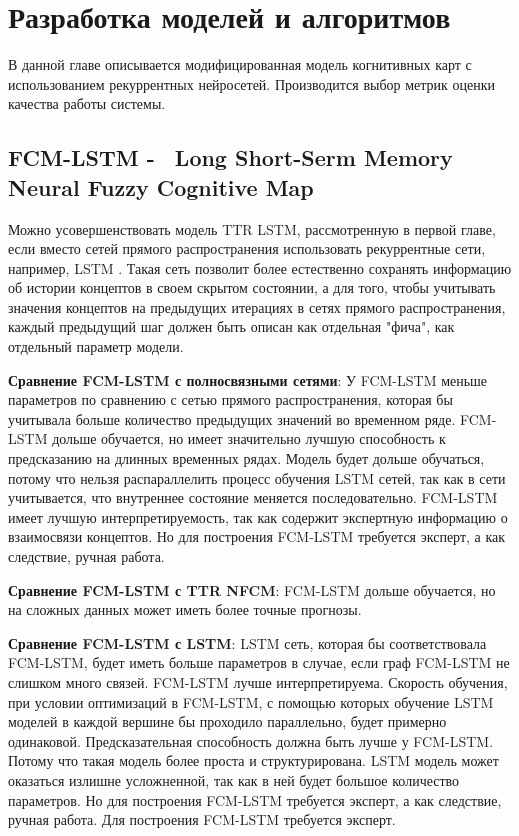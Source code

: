 \chapter{Разработка моделей и алгоритмов}

\begin{annotation}
	В данной главе описывается модифицированная модель
	когнитивных карт с использованием рекуррентных нейросетей.
	Производится выбор метрик оценки качества работы системы.
\end{annotation}

\section{FCM-LSTM -~ Long Short-Serm Memory Neural Fuzzy Cognitive Map}

Можно усовершенствовать модель TTR LSTM, рассмотренную в первой главе,
если вместо сетей прямого распространения использовать рекуррентные сети,
например, LSTM \cite{LSTM_paper}. Такая сеть позволит более естественно
сохранять информацию об истории концептов в своем скрытом состоянии,
а для того, чтобы учитывать значения концептов на предыдущих итерациях
в сетях прямого распространения, каждый предыдущий шаг должен быть
описан как отдельная "фича", как отдельный параметр модели.

\textbf{Сравнение FCM-LSTM с полносвязными сетями}:
У FCM-LSTM меньше параметров по сравнению с сетью прямого распространения,
которая бы учитывала больше количество предыдущих значений во временном ряде.
FCM-LSTM дольше обучается, но имеет значительно лучшую способность к предсказанию
на длинных временных рядах.
Модель будет дольше обучаться, потому что нельзя распараллелить
процесс обучения LSTM сетей, так как в сети учитывается, что внутреннее состояние меняется последовательно.
FCM-LSTM имеет лучшую интерпретируемость, так как содержит
экспертную информацию о взаимосвязи концептов.
Но для построения FCM-LSTM требуется эксперт, а как следствие,
ручная работа.

\textbf{Сравнение FCM-LSTM с TTR NFCM}:
FCM-LSTM дольше обучается, но на сложных данных
может иметь более точные прогнозы.

\textbf{Сравнение FCM-LSTM с LSTM}:
LSTM сеть, которая бы соответствовала FCM-LSTM, будет иметь
больше параметров в случае, если граф FCM-LSTM не слишком
много связей. FCM-LSTM лучше интерпретируема.
Скорость обучения, при условии оптимизаций в FCM-LSTM, с
помощью которых обучение LSTM моделей в каждой вершине бы проходило
параллельно, будет примерно одинаковой.
Предсказательная способность должна быть лучше у FCM-LSTM.
Потому что такая модель более проста и структурирована.
LSTM модель может оказаться излишне усложненной, так как в ней будет
большое количество параметров.
Но для построения FCM-LSTM требуется эксперт, а как следствие,
ручная работа.
Для построения FCM-LSTM требуется эксперт.

